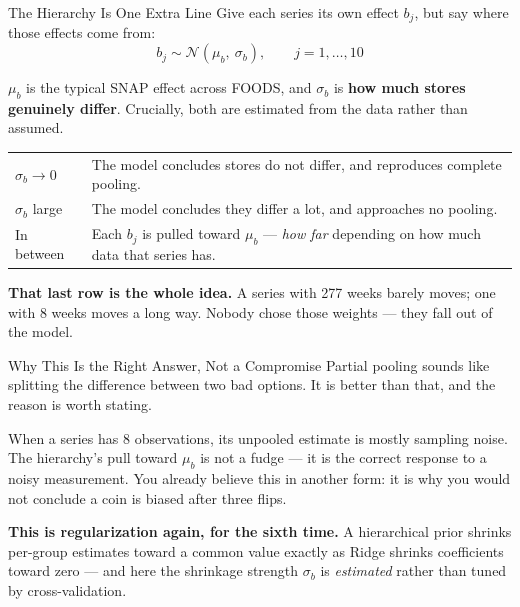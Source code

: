 \documentclass[aspectratio=169, 11pt]{beamer}
\begin{document}
\begin{frame}{The Hierarchy Is One Extra Line}
  Give each series its own effect $b_j$, but say where those effects come from:
  \[
    b_j \sim \mathcal{N}(\mu_b,\ \sigma_b), \qquad j = 1, \ldots, 10
  \]
  \vspace{-0.25cm}

  $\mu_b$ is the typical SNAP effect across FOODS, and $\sigma_b$ is \textbf{how much stores
  genuinely differ}. Crucially, both are estimated from the data rather than assumed.

  \begin{center}
    {\small
    \begin{tabular}{p{3.1cm}p{9.2cm}}
      \toprule
      $\sigma_b \rightarrow 0$ & The model concludes stores do not differ, and reproduces
      complete pooling. \\[3pt]
      $\sigma_b$ large & The model concludes they differ a lot, and approaches no pooling. \\[3pt]
      In between & Each $b_j$ is pulled toward $\mu_b$ --- \emph{how far} depending on how much
      data that series has. \\
      \bottomrule
    \end{tabular}
    }
  \end{center}

  \vspace{0.05cm}
  \textbf{That last row is the whole idea.} A series with 277 weeks barely moves; one with 8 weeks
  moves a long way. Nobody chose those weights --- they fall out of the model.
\end{frame}

\begin{frame}{Why This Is the Right Answer, Not a Compromise}
  Partial pooling sounds like splitting the difference between two bad options. It is better than
  that, and the reason is worth stating.

  \vspace{0.15cm}
  When a series has 8 observations, its unpooled estimate is mostly sampling noise. The
  hierarchy's pull toward $\mu_b$ is not a fudge --- it is the correct response to a noisy
  measurement. You already believe this in another form: it is why you would not conclude a coin
  is biased after three flips.

  \begin{keybox}
    \textbf{This is regularization again, for the sixth time.} A hierarchical prior shrinks
    per-group estimates toward a common value exactly as Ridge shrinks coefficients toward zero
    --- and here the shrinkage strength $\sigma_b$ is \emph{estimated} rather than tuned by
    cross-validation.
  \end{keybox}

  \vspace{0.1cm}
\end{frame}
\end{document}
